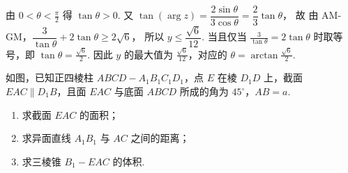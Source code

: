 \documentclass[UTF8,a4paper,oneside,11pt]{ctexbook}
\begin{document}
\begin{solution}
由 \(0<\theta<\frac{\pi}{2}\) 得 \(\tan\theta>0\). 又
\(\tan(\arg z)=\dfrac{2\sin\theta}{3\cos\theta}=\dfrac23\tan\theta\)，
故
由 AM-GM，\(\dfrac3{\tan\theta}+2\tan\theta\ge 2\sqrt6\)，
所以 \(y\le \dfrac{\sqrt6}{12}\).
当且仅当 \(\frac3{\tan\theta}=2\tan\theta\) 时取等号，即 \(\tan\theta=\frac{\sqrt6}{2}\). 因此 \(y\) 的最大值为 \(\frac{\sqrt6}{12}\)，对应的 \(\theta=\arctan\frac{\sqrt6}{2}\).
\end{solution}

\begin{problem}
如图，已知正四棱柱 \(ABCD-A_1B_1C_1D_1\)，点 \(E\) 在棱 \(D_1D\) 上，截面 \(EAC\parallel D_1B\)，且面 \(EAC\) 与底面 \(ABCD\) 所成的角为 \(45^\circ\)，\(AB=a\).

\begin{enumerate}
\item 求截面 \(EAC\) 的面积；
\item 求异面直线 \(A_1B_1\) 与 \(AC\) 之间的距离；
\item 求三棱锥 \(B_1-EAC\) 的体积.
\end{enumerate}

\end{problem}
\end{document}
